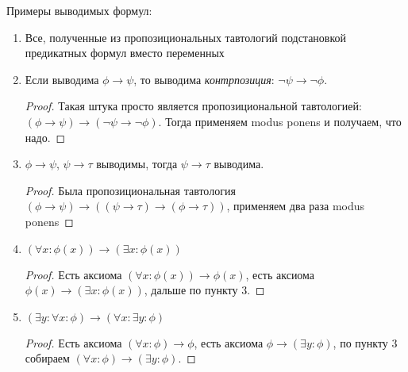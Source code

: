 \begin{exmp}
	Примеры выводимых формул:
	\begin{enumerate}
		\item Все, полученные из пропозициональных тавтологий подстановкой предикатных формул вместо переменных
		\item Если выводима $\phi \to \psi$, то выводима \textsl{контрпозиция}: $\lnot \psi \to \lnot \phi$.
			\begin{proof}
				Такая штука просто является пропозициональной тавтологией: $(\phi \to \psi) \to (\lnot \psi \to \lnot \phi)$.
				Тогда применяем modus ponens и получаем, что надо.
			\end{proof}
		\item $\phi \to \psi$, $\psi \to \tau$ выводимы, тогда $\psi \to \tau$ выводима.
			\begin{proof}
				Была пропозициональная тавтология $(\phi \to \psi) \to ((\psi \to \tau) \to (\phi \to \tau))$,
				применяем два раза modus ponens
			\end{proof}
		\item $(\forall x \colon \phi(x)) \to (\exists x \colon \phi(x))$
			\begin{proof}
				Есть аксиома $(\forall x \colon \phi(x)) \to \phi(x)$,
				есть аксиома $\phi(x) \to (\exists x \colon \phi(x))$,
				дальше по пункту 3.
			\end{proof}
		\item $(\exists y \colon \forall x \colon \phi) \to (\forall x \colon \exists y \colon \phi)$
			\begin{proof}
				Есть аксиома $(\forall x \colon \phi) \to \phi$,
				есть аксиома $\phi \to (\exists y \colon \phi)$,
				по пункту 3 собираем $(\forall x \colon \phi) \to (\exists y \colon \phi)$.


\end{proof}
\end{enumerate}
\end{exmp}
